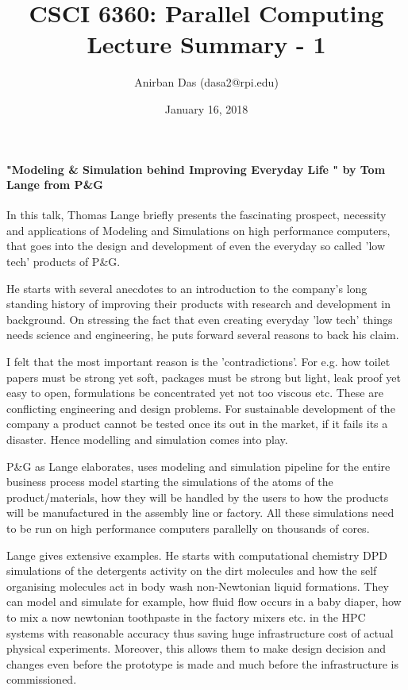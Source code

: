\documentclass[a4paper,12 pt]{article}
\title{CSCI 6360: Parallel Computing Lecture Summary - 1}
\author{Anirban Das (dasa2@rpi.edu) }
\date{January 16, 2018}
\begin{document}
\maketitle

\paragraph{"Modeling \& Simulation behind Improving Everyday Life " by Tom Lange from P\&G\\}

In this talk, Thomas Lange briefly presents the fascinating prospect, necessity and applications of Modeling and Simulations on high performance computers, that goes into the design and development of even the everyday so called 'low tech' products of P\&G.

He starts with several anecdotes to an introduction to the company's long standing history of improving their products with research and development in background. On stressing the fact that even creating everyday 'low tech' things needs science and engineering, he puts forward several reasons to back his claim.

I felt that the most important reason is the 'contradictions'. For e.g. how toilet papers must be strong yet soft, packages must be strong but light, leak proof yet easy to open, formulations be concentrated yet not too viscous etc. These are conflicting engineering and design problems. For sustainable development of the company a product cannot be tested once its out in the market, if it fails its a disaster. Hence modelling and simulation comes into play.

P\&G as Lange elaborates, uses modeling and simulation pipeline for the entire business process model starting the simulations of the atoms of the product/materials, how they will be handled by the users to how the products will be manufactured in the assembly line or factory. All these simulations need to be run on high performance computers parallelly on thousands of cores.

Lange gives extensive examples. He starts with computational chemistry DPD simulations of the detergents activity on the dirt molecules and how the self organising molecules act in body wash non-Newtonian liquid formations. They can model and simulate for example, how fluid flow occurs in a baby diaper, how to mix a now newtonian toothpaste in the factory mixers etc. in the HPC systems with reasonable accuracy thus saving huge infrastructure cost of actual physical experiments. Moreover, this allows them to make design decision and changes even before the prototype is made and much before the infrastructure is commissioned.
\end{document}
